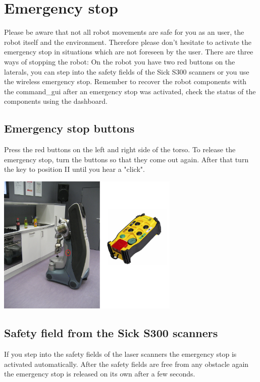 \section{Emergency stop}\label{sec:emergency_stop}
Please be aware that not all robot movements are safe for you as an user, the robot itself and the environment. Therefore please don't hesitate to activate the emergency stop in situations which are not foreseen by the user. There are three ways of stopping the robot: On the robot you have two red buttons on the laterals, you can step into the safety fields of the Sick S300 scanners or you use the wireless emergency stop. Remember to recover the robot components with the command\_gui after an emergency stop was activated, check the status of the components using the dashboard.

\subsection{Emergency stop buttons}
Press the red buttons on the left and right side of the torso. To release the emergency stop, turn the buttons so that they come out again. After that turn the key to position II until you hear a "click".

\begin{center}
\includegraphics[width=0.65\textwidth]{images/em_stop.jpg}
\end{center}

\subsection{Safety field from the Sick S300 scanners}
If you step into the safety fields of the laser scanners the emergency stop is activated automatically. After the safety fields are free from any obstacle again the emergency stop is released on its own after a few seconds.

